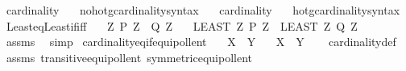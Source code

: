 \begin{isabellebody}
\ cardinality\ {\isacharparenleft}{\kern0pt}{\isachardoublequoteopen}{\isacharbar}{\kern0pt}{\isacharunderscore}{\kern0pt}{\isacharbar}{\kern0pt}{\isachardoublequoteclose}{\isacharparenright}{\kern0pt}\ \isamarkupfalse%
\isanewline
{}\isamarkupfalse%
\ no{\isacharunderscore}{\kern0pt}hotg{\isacharunderscore}{\kern0pt}cardinality{\isacharunderscore}{\kern0pt}syntax\ \ \isamarkupfalse%
\ cardinality\ {\isacharparenleft}{\kern0pt}{\isachardoublequoteopen}{\isacharbar}{\kern0pt}{\isacharunderscore}{\kern0pt}{\isacharbar}{\kern0pt}{\isachardoublequoteclose}{\isacharparenright}{\kern0pt}\ \isamarkupfalse%
\isanewline
{}\isamarkupfalse%
\ hotg{\isacharunderscore}{\kern0pt}cardinality{\isacharunderscore}{\kern0pt}syntax\isanewline
\isanewline
{}\isamarkupfalse%
\ Least{\isacharunderscore}{\kern0pt}eq{\isacharunderscore}{\kern0pt}Least{\isacharunderscore}{\kern0pt}if{\isacharunderscore}{\kern0pt}iff{\isacharcolon}{\kern0pt}\isanewline
\ \ \ {\isachardoublequoteopen}{\isasymAnd}Z{\isachardot}{\kern0pt}\ P\ Z\ {\isasymlongleftrightarrow}\ Q\ Z{\isachardoublequoteclose}\isanewline
\ \ \ {\isachardoublequoteopen}{\isacharparenleft}{\kern0pt}LEAST\ Z{\isachardot}{\kern0pt}\ P\ Z{\isacharparenright}{\kern0pt}\ {\isacharequal}{\kern0pt}\ {\isacharparenleft}{\kern0pt}LEAST\ Z{\isachardot}{\kern0pt}\ Q\ Z{\isacharparenright}{\kern0pt}{\isachardoublequoteclose}\isanewline
%
\isadelimproof
\ \ %
\endisadelimproof
%
\isatagproof
{}\isamarkupfalse%
\ assms\ \isamarkupfalse%
\ simp%
\endisatagproof
{\isafoldproof}%
%
\isadelimproof
\isanewline
%
\endisadelimproof
\isanewline
{}\isamarkupfalse%
\ cardinality{\isacharunderscore}{\kern0pt}eq{\isacharunderscore}{\kern0pt}if{\isacharunderscore}{\kern0pt}equipollent{\isacharcolon}{\kern0pt}\isanewline
\ \ \ {\isachardoublequoteopen}X\ {\isasymapprox}\ Y{\isachardoublequoteclose}\isanewline
\ \ \ {\isachardoublequoteopen}{\isacharbar}{\kern0pt}X{\isacharbar}{\kern0pt}\ {\isacharequal}{\kern0pt}\ {\isacharbar}{\kern0pt}Y{\isacharbar}{\kern0pt}{\isachardoublequoteclose}\isanewline
%
\isadelimproof
\ \ %
\endisadelimproof
%
\isatagproof
{}\isamarkupfalse%
\ cardinality{\isacharunderscore}{\kern0pt}def\ \isamarkupfalse%
\ assms\ transitive{\isacharunderscore}{\kern0pt}equipollent\ symmetric{\isacharunderscore}{\kern0pt}equipollent\isanewline

\end{isabellebody}

